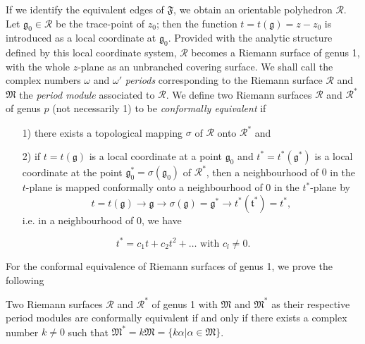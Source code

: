 If we identify the equivalent edges of $\mathfrak{F}$, we obtain an
orientable polyhedron $\mathscr{R}$. Let $\mathfrak{g}_0\in
\mathscr{R}$ be the trace-point of $z_0$; then the function
$t=t(\mathfrak{g})=z-z_0$ is introduced as a local coordinate at
$\mathfrak{g}_0$. Provided with the analytic structure defined by this
local coordinate system, $\mathscr{R}$ becomes a Riemann surface of
genus 1, with the whole $z$-plane as an unbranched covering
surface. We shall call the complex numbers $\omega$ and $\omega'$
\textit{periods} corresponding to the Riemann surface $\mathscr{R}$
and $\mathfrak{M}$ the \textit{period module} associated to
$\mathscr{R}$. We define two Riemann surfaces $\mathscr{R}$ and
$\mathscr{R}^{\ast}$ of genus $p$ (not necessarily 1) to be
\textit{conformally equivalent} if 
\begin{itemize}
\item[1)] there exists a topological mapping $\sigma$ of $\mathscr{R}$
  onto $\mathscr{R}^{\ast}$ and 

\item[2)] if $t=t(\mathfrak{g})$ is a local coordinate at a point
  $\mathfrak{g}_0$ and $t^{\ast} = t^{\ast}(\mathfrak{g}^{\ast})$ is a
  local coordinate at the point
  $\mathfrak{g}^{\ast}_0=\sigma(\mathfrak{g}_0)$ of
  $\mathscr{R}^{\ast}$, then a neighbourhood of $0$ in the $t$-plane
  is mapped conformally onto a neighbourhood of $0$ in the
  $t^{\ast}$-plane by 
$$
t=t(\mathfrak{g}) \to \mathfrak{g} \to \sigma (\mathfrak{g}) =
\mathfrak{g}^{\ast} \to t^{\ast} (\mathfrak{t}^{\ast})=t^{\ast},
$$
i.e. in a neighbourhood of $0$, we have 
\end{itemize}
$$
t^{\ast} = c_1 t + c_2 t^2 + \ldots \text{ with } c_l \neq 0.
$$\pageoriginale

For the conformal equivalence of Riemann surfaces of genus 1, we
prove the following 


\setcounter{thm}{5}
\begin{thm}\label{chap2:thm6}
Two Riemann surfaces $\mathscr{R}$ and $\mathscr{R}^{\ast}$ of genus 1
with $\mathfrak{M}$ and $\mathfrak{M}^{\ast}$ as their respective
period modules are conformally equivalent if and only if there exists
a complex number $k\neq 0$ such that $\mathfrak{M}^{\ast} = k
\mathfrak{M} =\{k \alpha |\alpha \in \mathfrak{M}\}$.
\end{thm}

